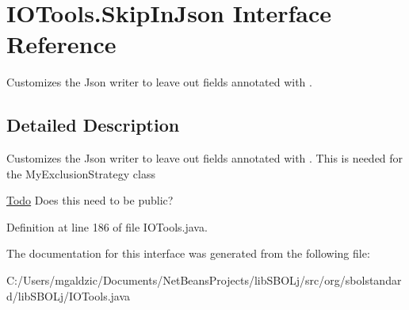\hypertarget{interfaceorg_1_1sbolstandard_1_1lib_s_b_o_lj_1_1_i_o_tools_1_1_skip_in_json}{
\section{IOTools.SkipInJson Interface Reference}
\label{interfaceorg_1_1sbolstandard_1_1lib_s_b_o_lj_1_1_i_o_tools_1_1_skip_in_json}
}


Customizes the Json writer to leave out fields annotated with .  




\subsection{Detailed Description}
Customizes the Json writer to leave out fields annotated with . This is needed for the MyExclusionStrategy class \begin{Desc}
\item[\hyperlink{todo__todo000005}{Todo}]Does this need to be public?\end{Desc}


Definition at line 186 of file IOTools.java.



The documentation for this interface was generated from the following file:\begin{DoxyCompactItemize}
\item 
C:/Users/mgaldzic/Documents/NetBeansProjects/libSBOLj/src/org/sbolstandard/libSBOLj/IOTools.java\end{DoxyCompactItemize}
